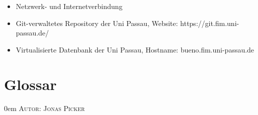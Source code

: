 \documentclass{article}
\makeatletter
\newcommand{\sectionauthor}[1]{
	{\parindent 0em \large \scshape Autor: #1 \par \nobreak \vspace*{2em}}
	\@afterheading
}
\makeatother
\begin{document}
\begin{itemize}
\item \begin{flushleft} Netzwerk- und Internetverbindung \end{flushleft} 
\item \begin{flushleft} Git-verwaltetes Repository der Uni Passau, Website: https://git.fim.uni-passau.de/ \end{flushleft} 
\item \begin{flushleft} Virtualisierte Datenbank der Uni Passau, Hostname: bueno.fim.uni-passau.de \end{flushleft}
\end{itemize}

\newpage

\section{Glossar} %
\sectionauthor{Jonas Picker}
\end{document}
